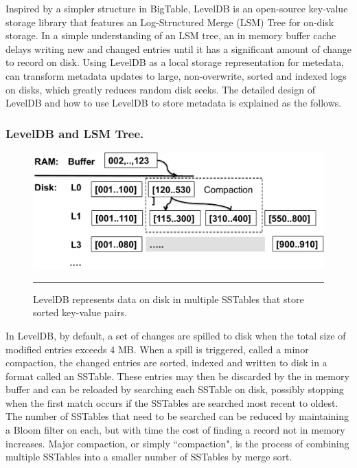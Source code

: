 Inspired by a simpler structure in BigTable\citep{BigTable}, 
LevelDB \citep{LevelDB} is an open-source key-value storage library
that features an Log-Structured Merge (LSM) Tree \citep{ONeil1996} for on-disk storage.
In a simple understanding of an LSM tree, an in memory buffer cache delays 
writing new and changed entries until it has a significant amount of change to record on disk.
Using LevelDB as a local storage representation for metedata, 
can transform metadata updates to large, non-overwrite, sorted and indexed logs on disks,
which greatly reduces random disk seeks.
The detailed design of LevelDB and how to use LevelDB to store metadata is explained as the follows.

\subsubsection*{LevelDB and LSM Tree. }

\begin{figure}[t]
\centering
\includegraphics[scale=0.4]{figs/leveldb}
\caption{LevelDB represents data on disk in multiple SSTables that store sorted key-value pairs.}
\vspace{10pt}
\hrule 
\label{fig:leveldb}
\end{figure}


In LevelDB, by default, a set of changes are spilled to disk when the total size of modified entries exceeds 4 MB.  When a spill is triggered, called a minor compaction, the changed entries are sorted, indexed and written to disk in a format called an SSTable\citep{BigTable}.  These entries may then be discarded by the in memory buffer and can be reloaded by searching each SSTable on disk, possibly stopping when the first match occurs if the SSTables are searched most recent to oldest.  The number of SSTables that need to be searched can be reduced by maintaining a Bloom filter\citep{bloomfilter} on each, but with time the cost of finding a record not in memory increases.  Major compaction, or simply ``compaction", is the process of combining multiple SSTables into a smaller number of SSTables by merge sort. 

